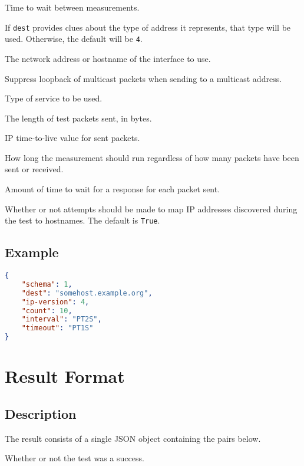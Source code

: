 \documentclass[10pt]{article}
\begin{document}
 Time to wait between measurements.

 If {\tt dest} provides clues about the type of
address it represents, that type will be used.  Otherwise, the default
will be {\tt 4}.

 The network address or hostname of the
interface to use.

 Suppress loopback of multicast packets
when sending to a multicast address.

 Type of service to be used.  

 The length of test packets sent, in
bytes.

 IP time-to-live value for sent packets.

 How long the measurement should run
regardless of how many packets have been sent or received.

 Amount of time to wait for a response
for each packet sent.

 Whether or not attempts should be made
to map IP addresses discovered during the test to hostnames.  The
default is {\tt True}.


\subsection{Example}
\begin{lstlisting}[language=json]
{
    "schema": 1,
    "dest": "somehost.example.org",
    "ip-version": 4,
    "count": 10,
    "interval": "PT2S",
    "timeout": "PT1S"
}
\end{lstlisting}



%
%

\section{Result Format}

\subsection{Description}
The result consists of a single JSON object containing the pairs
below.  \seejson

 Whether or not the test was a success.
\end{document}
